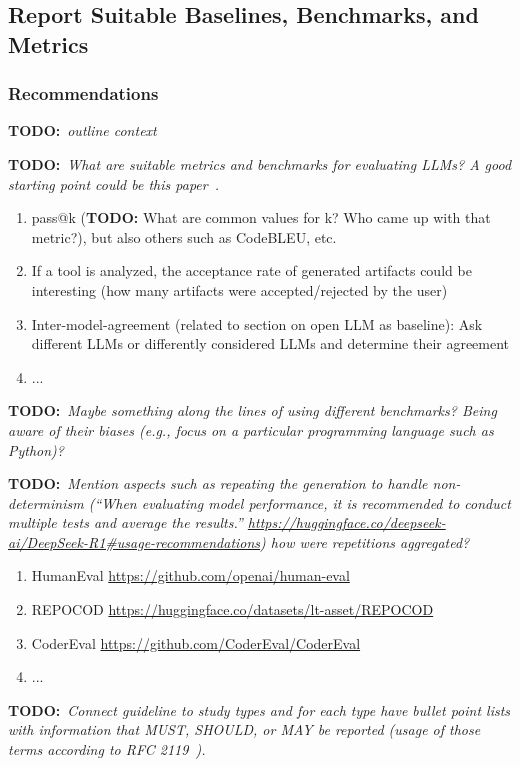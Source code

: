 \documentclass[11pt]{article}
\newcommand{\todo}[1]{{\textbf{TODO:}\ \textit{#1}}} %
\begin{document}
\subsection{Report Suitable Baselines, Benchmarks, and Metrics}

\subsubsection{Recommendations}

\todo{outline context}

\todo{What are suitable metrics and benchmarks for evaluating LLMs? A good starting point could be this paper~\cite{10.1145/3695988}.}

\begin{enumerate}
\item pass@k (\textbf{TODO:} What are common values for k? Who came up with that metric?), but also others such as CodeBLEU, etc.
\item If a tool is analyzed, the acceptance rate of generated artifacts could be interesting (how many artifacts were accepted/rejected by the user)
\item Inter-model-agreement (related to section on open LLM as baseline): Ask different LLMs or differently considered LLMs and determine their agreement 
\item ...
\end{enumerate}

\todo{Maybe something along the lines of using different benchmarks? Being aware of their biases (e.g., focus on a particular programming language such as Python)?}

\todo{Mention aspects such as repeating the generation to handle non-determinism (``When evaluating model performance, it is recommended to conduct multiple tests and average the results.''  \url{https://huggingface.co/deepseek-ai/DeepSeek-R1\#usage-recommendations}) how were repetitions aggregated?}

\begin{enumerate}
\item HumanEval \url{https://github.com/openai/human-eval}
\item REPOCOD \url{https://huggingface.co/datasets/lt-asset/REPOCOD}
\item CoderEval \url{https://github.com/CoderEval/CoderEval}
\item ...
\end{enumerate}

\todo{Connect guideline to study types and for each type have bullet point lists with information that MUST, SHOULD, or MAY be reported (usage of those terms according to RFC 2119~\cite{rfc2119}).}
\end{document}
